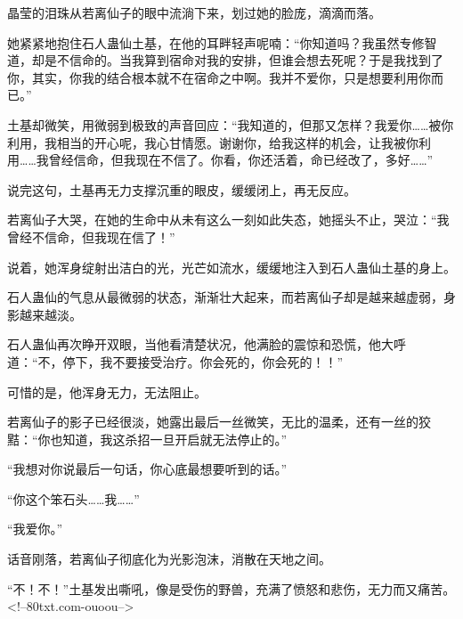 \begin{this_body}
晶莹的泪珠从若离仙子的眼中流淌下来，划过她的脸庞，滴滴而落。

她紧紧地抱住石人蛊仙土基，在他的耳畔轻声呢喃：“你知道吗？我虽然专修智道，却是不信命的。当我算到宿命对我的安排，但谁会想去死呢？于是我找到了你，其实，你我的结合根本就不在宿命之中啊。我并不爱你，只是想要利用你而已。”

土基却微笑，用微弱到极致的声音回应：“我知道的，但那又怎样？我爱你……被你利用，我相当的开心呢，我心甘情愿。谢谢你，给我这样的机会，让我被你利用……我曾经信命，但我现在不信了。你看，你还活着，命已经改了，多好……”

说完这句，土基再无力支撑沉重的眼皮，缓缓闭上，再无反应。

若离仙子大哭，在她的生命中从未有这么一刻如此失态，她摇头不止，哭泣：“我曾经不信命，但我现在信了！”

说着，她浑身绽射出洁白的光，光芒如流水，缓缓地注入到石人蛊仙土基的身上。

石人蛊仙的气息从最微弱的状态，渐渐壮大起来，而若离仙子却是越来越虚弱，身影越来越淡。

石人蛊仙再次睁开双眼，当他看清楚状况，他满脸的震惊和恐慌，他大呼道：“不，停下，我不要接受治疗。你会死的，你会死的！！”

可惜的是，他浑身无力，无法阻止。

若离仙子的影子已经很淡，她露出最后一丝微笑，无比的温柔，还有一丝的狡黠：“你也知道，我这杀招一旦开启就无法停止的。”

“我想对你说最后一句话，你心底最想要听到的话。”

“你这个笨石头……我……”

“我爱你。”

话音刚落，若离仙子彻底化为光影泡沫，消散在天地之间。

“不！不！”土基发出嘶吼，像是受伤的野兽，充满了愤怒和悲伤，无力而又痛苦。<!--80txt.com-ouoou-->

\end{this_body}

